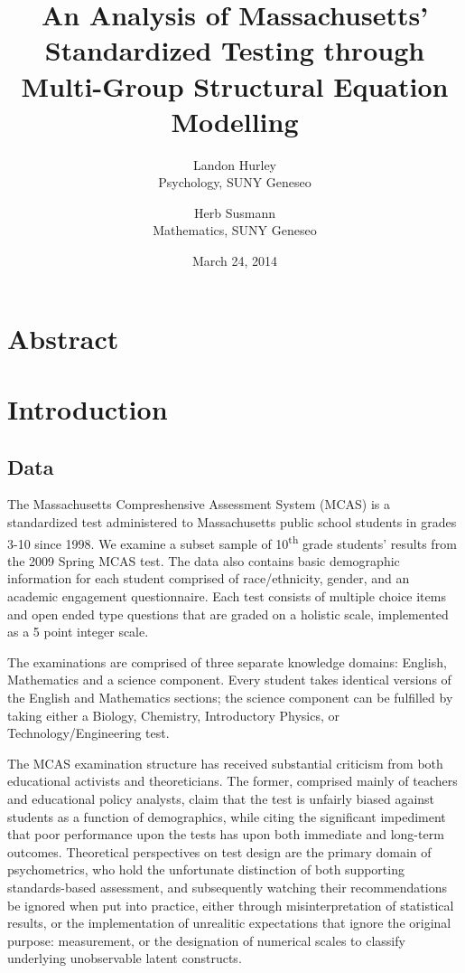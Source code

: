 \documentclass{article}\usepackage[]{graphicx}\usepackage[]{color}
\begin{document}
\title{An Analysis of Massachusetts' Standardized Testing through Multi-Group Structural Equation Modelling}
\date{March 24, 2014}
\author{Landon Hurley\\ Psychology, SUNY Geneseo \and Herb Susmann\\ Mathematics, SUNY Geneseo}

\maketitle

\section{Abstract}

\section{Introduction}

\subsection{Data}

The Massachusetts Compreshensive Assessment System (MCAS) is a standardized test administered to Massachusetts public school students in grades 3-10 since 1998. We examine a subset sample of 10\textsuperscript{th} grade students' results from the 2009 Spring MCAS test. The data also contains basic demographic information for each student comprised of race/ethnicity, gender, and an academic engagement questionnaire. Each test consists of multiple choice items and open ended type questions that are graded on a holistic scale, implemented as a 5 point integer scale. 

The examinations are comprised of three separate knowledge domains: English, Mathematics and a science component. Every student takes identical versions of the English and Mathematics sections; the science component can be fulfilled by taking either a Biology, Chemistry, Introductory Physics, or Technology/Engineering test. \cite{mcas_summary}

The MCAS examination structure has received substantial criticism from both educational activists and theoreticians. The former, comprised mainly of teachers and educational policy analysts, claim that the test is unfairly biased against students as a function of demographics, while citing the significant impediment that poor performance upon the tests has upon both immediate and long-term outcomes. Theoretical perspectives on test design are the primary domain of psychometrics, who hold the unfortunate distinction of both supporting standards-based assessment, and subsequently watching their recommendations be ignored when put into practice, either through misinterpretation of statistical results, or the implementation of unrealitic expectations that ignore the original purpose: measurement, or the designation of numerical scales to classify underlying unobservable latent constructs. 
\end{document}
